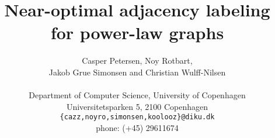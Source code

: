 \documentclass{acm_proc_article-sp}
\begin{document}
\title{Near-optimal adjacency labeling for power-law graphs}
%
%
%
%
%

%

\author{Casper Petersen, Noy Rotbart,\\ Jakob Grue Simonsen and Christian Wulff-Nilsen \\ \\
\small{Department of Computer Science, University of Copenhagen} \\
\small{Universitetsparken 5, 2100 Copenhagen}\\
 \small{\texttt{\{cazz,noyro,simonsen,koolooz\}@diku.dk}} \\
 \small{phone: (+45) 29611674}
 }
 
\end{document}
